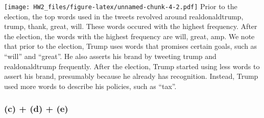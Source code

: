 \documentclass[]{article}
\newenvironment{Shaded}{\begin{snugshade}}{\end{snugshade}}
\newcommand{\KeywordTok}[1]{\textcolor[rgb]{0.13,0.29,0.53}{\textbf{#1}}}
\newcommand{\DataTypeTok}[1]{\textcolor[rgb]{0.13,0.29,0.53}{#1}}
\newcommand{\DecValTok}[1]{\textcolor[rgb]{0.00,0.00,0.81}{#1}}
\newcommand{\StringTok}[1]{\textcolor[rgb]{0.31,0.60,0.02}{#1}}
\newcommand{\OperatorTok}[1]{\textcolor[rgb]{0.81,0.36,0.00}{\textbf{#1}}}
\newcommand{\NormalTok}[1]{#1}
\begin{document}
\begin{Shaded}
\end{Shaded}

\texttt{[image: HW2\_files/figure-latex/unnamed-chunk-4-2.pdf]} Prior to
the election, the top words used in the tweets revolved around
realdonaldtrump, trump, thank, great, will. These words occured with the
highest frequency. After the election, the words with the highest
frequency are will, great, amp. We note that prior to the election,
Trump uses words that promises certain goals, such as ``will'' and
``great''. He also asserts his brand by tweeting trump and
realdonaldtrump frequently. After the election, Trump started using less
words to assert his brand, presumably because he already has
recognition. Instead, Trump used more words to describe his policies,
such as ``tax''.

\subsubsection{(c) + (d) + (e)}\label{c-d-e}
\end{document}
